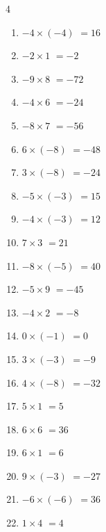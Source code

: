 \begin{multicols}{4}
\begin{enumerate}
  \item $-4\times (-4)$
        $=16$

  \item $-2\times 1$
        $=-2$

  \item $-9\times 8$
        $=-72$

  \item $-4\times 6$
        $=-24$

  \item $-8\times 7$
        $=-56$

  \item $6\times (-8)$
        $=-48$

  \item $3\times (-8)$
        $=-24$

  \item $-5\times (-3)$
        $=15$

  \item $-4\times (-3)$
        $=12$

  \item $7\times 3$
        $=21$

  \item $-8\times (-5)$
        $=40$

  \item $-5\times 9$
        $=-45$

  \item $-4\times 2$
        $=-8$

  \item $0\times (-1)$
        $=0$

  \item $3\times (-3)$
        $=-9$

  \item $4\times (-8)$
        $=-32$

\columnbreak %

  \item $5\times 1$
        $=5$

  \item $6\times 6$
        $=36$

  \item $6\times 1$
        $=6$

  \item $9\times (-3)$
        $=-27$

  \item $-6\times (-6)$
        $=36$

  \item $1\times 4$
        $=4$


\end{enumerate}
\end{multicols}
